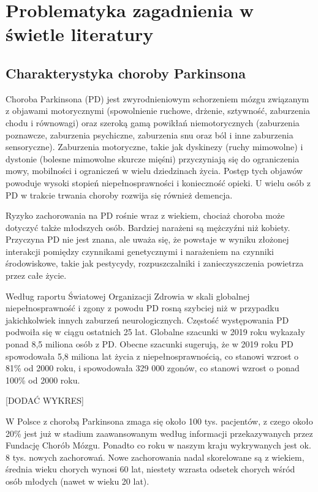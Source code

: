 \chapter{Problematyka zagadnienia w świetle literatury}
\label{ch:problematyka}

\section{Charakterystyka choroby Parkinsona}
\label{sec:charakterystykaPD}
Choroba Parkinsona (PD) jest zwyrodnieniowym schorzeniem mózgu związanym z objawami motorycznymi (spowolnienie ruchowe,
drżenie, sztywność, zaburzenia chodu i równowagi) oraz szeroką gamą powikłań niemotorycznych (zaburzenia poznawcze,
zaburzenia psychiczne, zaburzenia snu oraz ból i inne zaburzenia sensoryczne).
Zaburzenia motoryczne, takie jak dyskinezy (ruchy mimowolne) i dystonie (bolesne mimowolne skurcze mięśni) przyczyniają
się do ograniczenia mowy, mobilności i ograniczeń w wielu dziedzinach życia.
Postęp tych objawów powoduje wysoki stopień niepełnosprawności i konieczność opieki.
U wielu osób z PD w trakcie trwania choroby rozwija się również demencja.

Ryzyko zachorowania na PD rośnie wraz z wiekiem, chociaż choroba może dotyczyć także młodszych osób.
Bardziej narażeni są mężczyźni niż kobiety.
Przyczyna PD nie jest znana, ale uważa się, że powstaje w wyniku złożonej interakcji pomiędzy czynnikami genetycznymi i
narażeniem na czynniki środowiskowe, takie jak pestycydy, rozpuszczalniki i zanieczyszczenia powietrza przez całe życie.

Według raportu Światowej Organizacji Zdrowia\cite{WHO} w skali globalnej niepełnosprawność i zgony z powodu PD
rosną szybciej niż w przypadku jakichkolwiek innych zaburzeń neurologicznych.
Częstość występowania PD podwoiła się w ciągu ostatnich 25 lat.
Globalne szacunki w 2019 roku wykazały ponad 8,5 miliona osób z PD.
Obecne szacunki sugerują, że w 2019 roku PD spowodowała 5,8 miliona lat życia z niepełnosprawnością, co
stanowi wzrost o 81\% od 2000 roku, i spowodowała 329 000 zgonów, co stanowi wzrost o ponad 100\% od 2000 roku.


[DODAĆ WYKRES]


W Polsce z chorobą Parkinsona zmaga się około 100 tys. pacjentów, z czego około 20\% jest już w stadium zaawansowanym
według informacji przekazywanych przez Fundację Chorób Mózgu.
Ponadto co roku w naszym kraju wykrywanych jest ok. 8 tys. nowych zachorowań.
Nowe zachorowania nadal skorelowane są z wiekiem, średnia wieku chorych wynosi 60 lat, niestety wzrasta odsetek chorych wśród osób młodych (nawet w wieku 20 lat).




